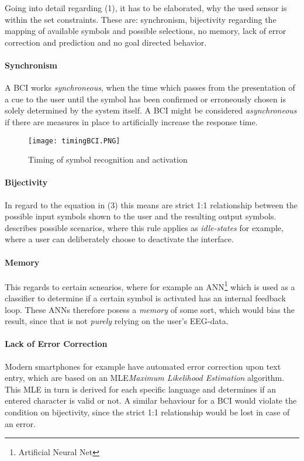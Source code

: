             Going into detail regarding (1), it has to be elaborated, why the used sensor is within the set constraints. These are: synchronism, bijectivity regarding the mapping of available symbols and possible selections, no memory, lack of error correction and prediction and no goal directed behavior.

            \paragraph{Synchronism} A BCI works \textit{synchroneous}, when the time which passes from the presentation of a cue to the user until the symbol has been confirmed or erroneously chosen is solely determined by the system itself. A BCI might be considered \textit{asynchroneous} if there are measures in place to artificially increase the response time. 

            \begin{figure}[h]     %
                \centering
                \texttt{[image: timingBCI.PNG]} 
                \caption{Timing of symbol recognition and activation }\label{itr-timing}
            \end{figure}

            \paragraph{Bijectivity} In regard to the equation in (3) this means are strict 1:1 relationship between the possible input symbols shown to the user and the resulting output symbols. \cite{Yuan.2013} describes possible scenarios, where this rule applies as \textit{idle-states} for example, where a user can deliberately choose to deactivate the interface.

            \paragraph{Memory} This regards to certain scnearios, where for example an ANN\footnote{Artificial Neural Net} which is used as a classifier to determine if a certain symbol is activated has an internal feedback loop. These ANNs therefore posess a \textit{memory} of some sort, which would bias the result, since that is not \textit{purely} relying on the user's EEG-data.

            \paragraph{Lack of Error Correction} Modern smartphones for example have automated error correction upon text entry, which are based on an MLE\textit{Maximum Likelihood Estimation} algorithm. This MLE in turn is derived for each specific language and determines if an entered character is valid or not. A similar behaviour for a BCI would violate the condition on bijectivity, since the strict 1:1 relationship would be lost in case of an error.
            

